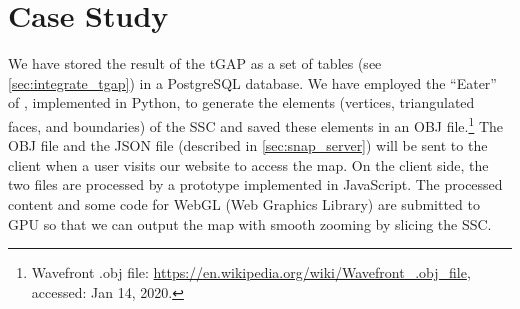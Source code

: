 \documentclass[ijgi,article,submit,moreauthors,pdftex]{Definitions/mdpi}
\begin{document}
%
%
%
%
%
%
%
%






\section{Case Study}
\label{sec:case_study}

We have stored the result of the tGAP 
as a set of tables (see \sect\ref{sec:integrate_tgap}) 
in a PostgreSQL database.
We have employed the ``Eater'' of \citet{Suba2014Merge},
implemented in Python, 
to generate the elements
(vertices, triangulated faces, and boundaries)
of the SSC \citep{vanOosterom2014tGAPSSC} 
and saved these elements in an OBJ file.\footnote{%
Wavefront .obj file:
\url{https://en.wikipedia.org/wiki/Wavefront_.obj_file},
accessed: Jan 14, 2020.}
%
The OBJ file and the JSON file (described in \sect\ref{sec:snap_server}) 
will be sent to the client 
when a user visits our website to access the map.
On the client side,
the two files are processed
by a prototype implemented in JavaScript.
The processed content and some code for WebGL (Web Graphics Library)
are submitted to GPU so that we can output the map with smooth zooming
by slicing the SSC.
\end{document}
